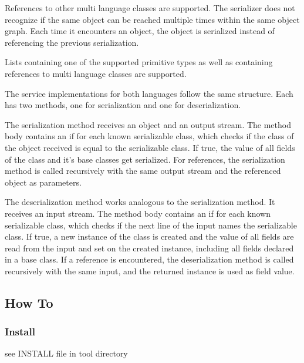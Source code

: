 \documentclass[a4paper,12pt]{article}
\begin{document}
References to other multi language classes are supported. The serializer does not recognize if the same object can be reached multiple times within the same object graph. Each time it encounters an object, the object is serialized instead of referencing the previous serialization.

Lists containing one of the supported primitive types as well as containing references to multi language classes are supported.

The service implementations for both languages follow the same structure. Each has two methods, one for serialization and one for deserialization. 

The serialization method receives an object and an output stream. The  method body contains an if for each known serializable class, which checks if the class of the object received is equal to the serializable class. If true, the value of all fields of the class and it's base classes get serialized. For references, the  serialization method is called recursively with the same output stream and the  referenced object as parameters.

The deserialization method works analogous to the serialization method. It receives an input stream. The method body contains an if for each known serializable class, which checks if the next line of the input names  the serializable class. If true, a new instance of the class is created and the value of all fields are read from the input and set on the created instance, including all fields declared in a base class. If a reference is encountered, the deserialization method is called recursively with the same input, and the returned instance is used as field value.

\subsection{How To}
\subsubsection{Install}
see INSTALL file in tool directory
\end{document}
